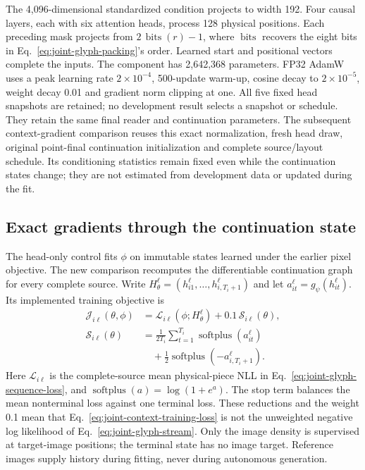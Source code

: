 The 4,096-dimensional standardized condition projects to width 192. Four
causal layers, each with six attention heads, process 128 physical positions.
Each preceding mask projects from $2\,\operatorname{bits}(r)-1$, where
$\operatorname{bits}$ recovers the eight bits in Eq.~\ref{eq:joint-glyph-packing}'s
order. Learned start and positional vectors complete the inputs. The component has 2,642,368
parameters. FP32 AdamW uses a peak learning rate $2\times10^{-4}$, 500-update
warm-up, cosine decay to $2\times10^{-5}$, weight decay 0.01 and gradient norm
clipping at one. All five fixed head snapshots are retained; no development
result selects a snapshot or schedule. They retain the same final reader and
continuation parameters. The subsequent context-gradient comparison reuses
this exact normalization, fresh head draw, original point-final continuation
initialization and complete source/layout schedule. Its conditioning statistics
remain fixed even while the continuation states change; they are not estimated
from development data or updated during the fit.

\subsection*{Exact gradients through the continuation state}
The head-only control fits $\phi$ on immutable states learned under the earlier
pixel objective. The new comparison recomputes the differentiable continuation
graph for every complete source. Write
$H_\theta^\ell=(h_{i1}^\ell,\ldots,h_{i,T_i+1}^\ell)$ and let
$a_{it}^\ell=g_\psi(h_{it}^\ell)$. Its implemented training objective is
\begin{equation}
 \begin{aligned}
 \mathcal J_{i\ell}(\theta,\phi)
 &=\mathcal L_{i\ell}(\phi;H_\theta^\ell)
       +0.1\,\mathcal S_{i\ell}(\theta),\\
 \mathcal S_{i\ell}(\theta)
 &=\frac1{2T_i}\sum_{t=1}^{T_i}
       \operatorname{softplus}(a_{it}^\ell)\\
 &\quad+\frac12\operatorname{softplus}(-a_{i,T_i+1}^\ell).
 \end{aligned}
 \label{eq:joint-context-training-loss}
\end{equation}
Here $\mathcal L_{i\ell}$ is the complete-source mean physical-piece NLL in
Eq.~\ref{eq:joint-glyph-sequence-loss}, and
$\operatorname{softplus}(a)=\log(1+e^a)$. The stop term balances the mean
nonterminal loss against one terminal loss. These reductions and the weight
0.1 mean that Eq.~\ref{eq:joint-context-training-loss} is not the unweighted
negative log likelihood of Eq.~\ref{eq:joint-glyph-stream}. Only the image
density is supervised at target-image positions; the terminal state has no
image target. Reference images supply history during fitting, never during
autonomous generation.

